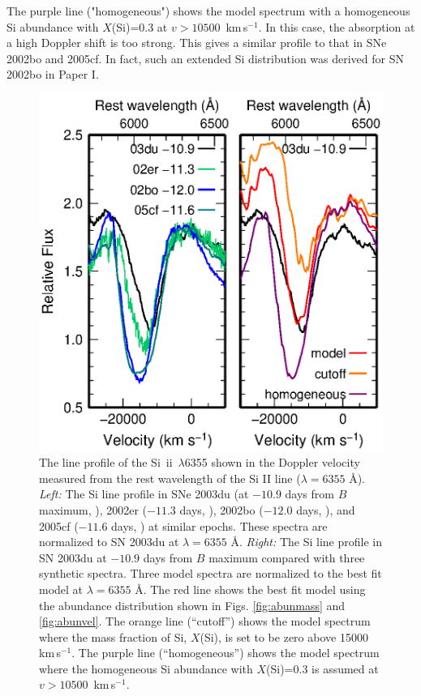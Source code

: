 \documentclass[usegraphicx,usenatbib]{mn2e}
\newcommand{\kms}{\mbox{\,km\,s$^{-1}$}}
\newcommand{\SiII}{Si~{\sc ii}}
\begin{document}
The purple line ("homogeneous") shows the model spectrum with a homogeneous Si
abundance with $X$(Si)=0.3 at $v>10500$ \kms. In this case, the absorption at a
high Doppler shift is too strong. This gives a similar profile to that in SNe
2002bo and 2005cf. In fact, such an extended Si distribution was derived for SN
2002bo in Paper I.


\begin{figure}
  \includegraphics[scale=0.70]{f10.eps} 
  \caption{The line profile of the \SiII\ $\lambda$6355 shown in the 
Doppler velocity measured from the rest wavelength of the Si {\sc II} line
($\lambda=6355$ \AA).
{\it Left:} The Si line profile in SNe 2003du (at $-10.9$ days from $B$ maximum, 
\citealt{stanishev07}), 
2002er ($-11.3$ days, \citealt{kotak05}), 2002bo ($-12.0$ days, \citealt{benetti04}), 
and 2005cf ($-11.6$ days, \citealt{garavini07})
at similar epochs.
These spectra are normalized to SN 2003du at $\lambda=6355$ \AA.
{\it Right:} The Si line profile in SN 2003du at $-10.9$ days from $B$ maximum
compared with three synthetic spectra.
Three model spectra are normalized to the best fit model at $\lambda=6355$ \AA.
The red line shows the best fit model using the abundance distribution
shown in Figs. \ref{fig:abunmass} and \ref{fig:abunvel}.
The orange line (``cutoff'') shows the model spectrum where 
the mass fraction of Si, $X$(Si), is set to be zero above 15000 \kms. 
The purple line (``homogeneous'') shows the model spectrum where 
the homogeneous Si abundance with $X$(Si)=0.3 is assumed at $v>10500$ \kms.
}
\label{fig:Si}
\end{figure}
\end{document}
